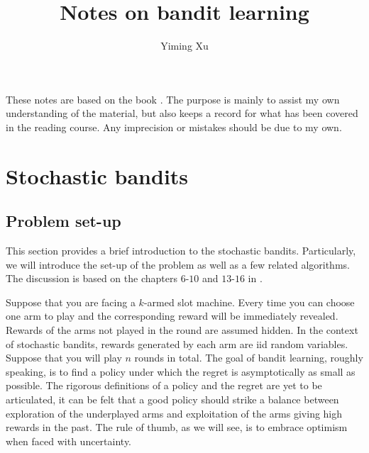 \documentclass[10pt,a4article]{amsart}
\numberwithin{equation}{section}
\theoremstyle{plain}
\theoremstyle{definition}
\begin{document}
\title{\textbf{Notes on bandit learning}}
\date{}
\author{Yiming Xu}
\maketitle


These notes are based on the book \cite{lattimore2018bandit}. The purpose is mainly to assist my own understanding of the material, but also keeps a record for what has been covered in the reading course. Any imprecision or mistakes should be due to my own. 

\section{Stochastic bandits}\label{sec1}

\subsection{Problem set-up}

This section provides a brief introduction to the stochastic bandits. Particularly, we will introduce the set-up of the problem as well as a few related algorithms. The discussion is based on the chapters $6$-$10$ and $13$-$16$ in \cite{lattimore2018bandit}.

Suppose that you are facing a $k$-armed slot machine. Every time you can choose one arm to play and the corresponding reward will be immediately revealed. Rewards of the arms not played in the round are assumed hidden. In the context of stochastic bandits, rewards generated by each arm are iid random variables. Suppose that you will play $n$ rounds in total. The goal of bandit learning, roughly speaking, is to find a policy under which the regret is asymptotically as small as possible. The rigorous definitions of a policy and the regret are yet to be articulated, it can be felt that a good policy should strike a balance between exploration of the underplayed arms and exploitation of the arms giving high rewards in the past. The rule of thumb, as we will see, is to embrace optimism when faced with uncertainty. 
\end{document}
